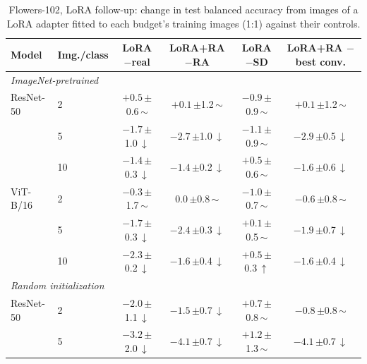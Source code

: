 \begin{table}[htbp]
\centering
\footnotesize
\setlength{\tabcolsep}{4pt}
\caption{Flowers-102, LoRA follow-up: change in test balanced accuracy from images of a LoRA adapter fitted to each budget's training images (1:1) against their controls.}
\label{tab:paper-flowers102-lora}
\begin{tabular}{llcccc}
\toprule
Model & Img./class & \shortstack{LoRA\\$-$real} & \shortstack{LoRA+RA\\$-$RA} & \shortstack{LoRA\\$-$SD} & \shortstack{LoRA+RA\\$-$best conv.} \\
\midrule
\multicolumn{6}{l}{\textit{ImageNet-pretrained}} \\
ResNet-50 & 2 & $+0.5$\,{\scriptsize$\pm$0.6}\,$\sim$ & $+0.1$\,{\scriptsize$\pm$1.2}\,$\sim$ & $-0.9$\,{\scriptsize$\pm$0.9}\,$\sim$ & $+0.1$\,{\scriptsize$\pm$1.2}\,$\sim$ \\
 & 5 & $-1.7$\,{\scriptsize$\pm$1.0}\,$\downarrow$ & $-2.7$\,{\scriptsize$\pm$1.0}\,$\downarrow$ & $-1.1$\,{\scriptsize$\pm$0.9}\,$\sim$ & $-2.9$\,{\scriptsize$\pm$0.5}\,$\downarrow$ \\
 & 10 & $-1.4$\,{\scriptsize$\pm$0.3}\,$\downarrow$ & $-1.4$\,{\scriptsize$\pm$0.2}\,$\downarrow$ & $+0.5$\,{\scriptsize$\pm$0.6}\,$\sim$ & $-1.6$\,{\scriptsize$\pm$0.6}\,$\downarrow$ \\
\addlinespace[2pt]
ViT-B/16 & 2 & $-0.3$\,{\scriptsize$\pm$1.7}\,$\sim$ & $0.0$\,{\scriptsize$\pm$0.8}\,$\sim$ & $-1.0$\,{\scriptsize$\pm$0.7}\,$\sim$ & $-0.6$\,{\scriptsize$\pm$0.8}\,$\sim$ \\
 & 5 & $-1.7$\,{\scriptsize$\pm$0.3}\,$\downarrow$ & $-2.4$\,{\scriptsize$\pm$0.3}\,$\downarrow$ & $+0.1$\,{\scriptsize$\pm$0.5}\,$\sim$ & $-1.9$\,{\scriptsize$\pm$0.7}\,$\downarrow$ \\
 & 10 & $-2.3$\,{\scriptsize$\pm$0.2}\,$\downarrow$ & $-1.6$\,{\scriptsize$\pm$0.4}\,$\downarrow$ & $+0.5$\,{\scriptsize$\pm$0.3}\,$\uparrow$ & $-1.6$\,{\scriptsize$\pm$0.4}\,$\downarrow$ \\
\midrule
\multicolumn{6}{l}{\textit{Random initialization}} \\
ResNet-50 & 2 & $-2.0$\,{\scriptsize$\pm$1.1}\,$\downarrow$ & $-1.5$\,{\scriptsize$\pm$0.7}\,$\downarrow$ & $+0.7$\,{\scriptsize$\pm$0.8}\,$\sim$ & $-0.8$\,{\scriptsize$\pm$0.8}\,$\sim$ \\
 & 5 & $-3.2$\,{\scriptsize$\pm$2.0}\,$\downarrow$ & $-4.1$\,{\scriptsize$\pm$0.7}\,$\downarrow$ & $+1.2$\,{\scriptsize$\pm$1.3}\,$\sim$ & $-4.1$\,{\scriptsize$\pm$0.7}\,$\downarrow$ \\

\end{tabular}
\end{table}
